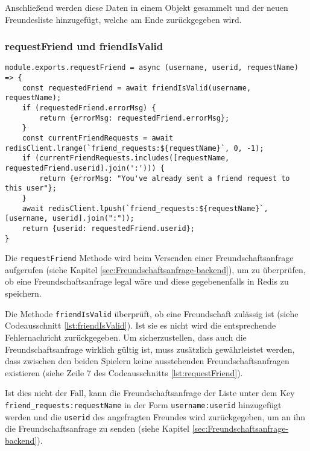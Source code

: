 Anschließend werden diese Daten in einem Objekt gesammelt und der neuen Freundesliste hinzugefügt, welche am Ende zurückgegeben wird.

\subsubsection{requestFriend und friendIsValid}
\label{sec:requestFriend}

\begin{lstlisting}[style=codeStyle, caption={requestFriend Methode um eine Freundschaftsanfrage in redis zu speichern}, label={lst:requestFriend}]
module.exports.requestFriend = async (username, userid, requestName) => {
    const requestedFriend = await friendIsValid(username, requestName);
    if (requestedFriend.errorMsg) {
        return {errorMsg: requestedFriend.errorMsg};
    }
    const currentFriendRequests = await redisClient.lrange(`friend_requests:${requestName}`, 0, -1);
    if (currentFriendRequests.includes([requestName, requestedFriend.userid].join(':'))) {
        return {errorMsg: "You've already sent a friend request to this user"};
    }
    await redisClient.lpush(`friend_requests:${requestName}`, [username, userid].join(":"));
    return {userid: requestedFriend.userid};
}
\end{lstlisting}

Die \verb|requestFriend| Methode wird beim Versenden einer Freundschaftsanfrage aufgerufen (siehe Kapitel \ref{sec:Freundschaftsanfrage-backend}), um zu überprüfen, ob eine Freundschaftsanfrage legal wäre und diese gegebenenfalls in Redis zu speichern.

Die Methode \verb|friendIsValid| überprüft, ob eine Freundschaft zulässig ist (siehe Codeausschnitt \ref{lst:friendIsValid}). Ist sie es nicht wird die entsprechende Fehlernachricht zurückgegeben. Um sicherzustellen, dass auch die Freundschaftsanfrage wirklich gültig ist, muss zusätzlich gewährleistet werden, dass zwischen den beiden Spielern keine ausstehenden Freundschaftsanfragen existieren (siehe Zeile 7 des Codeausschnitts \ref{lst:requestFriend}).

Ist dies nicht der Fall, kann die Freundschaftsanfrage der Liste unter dem Key \linebreak \verb|friend_requests:requestName| in der Form \verb|username:userid| hinzugefügt werden und die \verb|userid| des angefragten Freundes wird zurückgegeben, um an ihn die Freundschaftsanfrage zu senden (siehe Kapitel \ref{sec:Freundschaftsanfrage-backend}).

